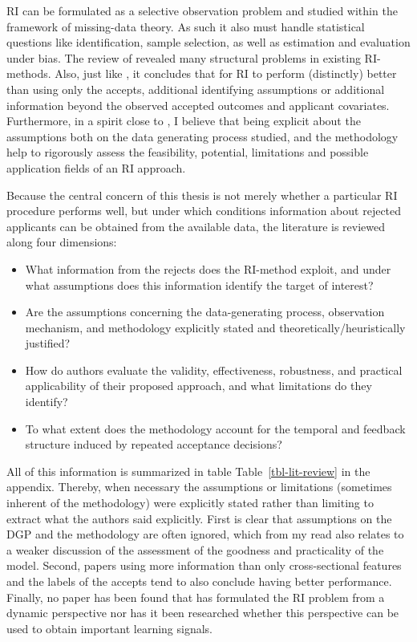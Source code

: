 \documentclass[
  12pt,
]{article}
\providecommand{\tightlist}{%
  \setlength{\itemsep}{0pt}\setlength{\parskip}{0pt}}
\begin{document}
RI can be formulated as a selective observation problem and studied
within the framework of missing-data theory. As such it also must handle
statistical questions like identification, sample selection, as well as
estimation and evaluation under bias. The review of
\textcite{ehrhardt2021rejectReview} revealed many structural problems in
existing RI-methods. Also, just like \textcite{HandHanley1993CanRIWork},
it concludes that for RI to perform (distinctly) better than using only
the accepts, additional identifying assumptions or additional
information beyond the observed accepted outcomes and applicant
covariates. Furthermore, in a spirit close to
\textcite{ehrhardt2021rejectReview}, I believe that being explicit about
the assumptions both on the data generating process studied, and the
methodology help to rigorously assess the feasibility, potential,
limitations and possible application fields of an RI approach.

Because the central concern of this thesis is not merely whether a
particular RI procedure performs well, but under which conditions
information about rejected applicants can be obtained from the available
data, the literature is reviewed along four dimensions:

\begin{itemize}
\tightlist
\item
  What information from the rejects does the RI-method exploit, and
  under what assumptions does this information identify the target of
  interest?
\item
  Are the assumptions concerning the data-generating process,
  observation mechanism, and methodology explicitly stated and
  theoretically/heuristically justified?
\item
  How do authors evaluate the validity, effectiveness, robustness, and
  practical applicability of their proposed approach, and what
  limitations do they identify?
\item
  To what extent does the methodology account for the temporal and
  feedback structure induced by repeated acceptance decisions?
\end{itemize}

All of this information is summarized in table
Table~\ref{tbl-lit-review} in the appendix. Thereby, when necessary the
assumptions or limitations (sometimes inherent of the methodology) were
explicitly stated rather than limiting to extract what the authors said
explicitly. First is clear that assumptions on the DGP and the
methodology are often ignored, which from my read also relates to a
weaker discussion of the assessment of the goodness and practicality of
the model. Second, papers using more information than only
cross-sectional features and the labels of the accepts tend to also
conclude having better performance. Finally, no paper has been found
that has formulated the RI problem from a dynamic perspective nor has it
been researched whether this perspective can be used to obtain important
learning signals.
\end{document}

